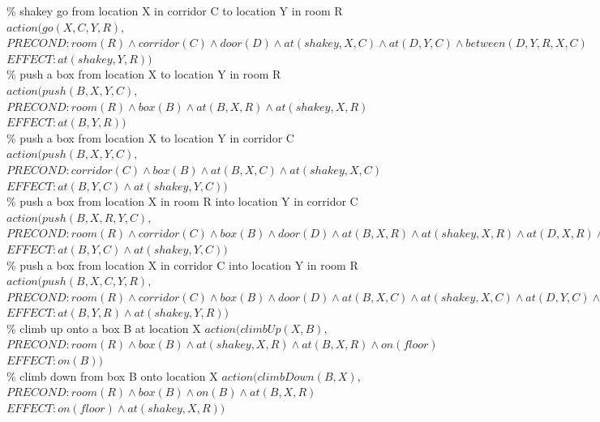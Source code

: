 \documentclass{article}%
\begin{document}
\begin{enumerate}
	\% shakey go from location X in corridor C to location Y in room R
	$action( go(X,C,Y,R), $ \\
	$PRECOND: room(R) \wedge corridor(C) \wedge door(D) \wedge at(shakey,X,C) \wedge at(D,Y,C) \wedge between(D,Y,R,X,C) $ \\
	$EFFECT: at(shakey,Y,R)) $\\
	
	\% push a box from location X to location Y in room R
	$action( push(B,X,Y,C), $ \\
	$PRECOND: room(R) \wedge box(B) \wedge at(B,X,R) \wedge at(shakey,X,R)$\\
	$EFFECT: at(B,Y,R)) $\\
	
    \% push a box from location X to location Y in corridor C
	$action( push(B,X,Y,C), $ \\
	$PRECOND: corridor(C) \wedge box(B) \wedge at(B,X,C) \wedge at(shakey,X,C)$\\
	$EFFECT: at(B,Y,C) \wedge at(shakey,Y,C)) $\\
	
	\% push a box from location X in room R into location Y in corridor C 
	$action( push(B,X,R,Y,C), $ \\
	$PRECOND: room(R) \wedge corridor(C) \wedge box(B) \wedge door(D) \wedge at(B,X,R) \wedge at(shakey,X,R)  \wedge at(D,X,R) \wedge between(D,X,R,Y,C)$ \\
	$EFFECT: at(B,Y,C) \wedge at(shakey,Y,C)) $\\
	
	\% push a box from location X in corridor C into location Y in room R
	$action( push(B,X,C,Y,R), $ \\
	$PRECOND: room(R) \wedge corridor(C) \wedge box(B) \wedge door(D) \wedge at(B,X,C) \wedge at(shakey,X,C) \wedge at(D,Y,C) \wedge between(D,Y,R,X,C)$ \\
	$EFFECT: at(B,Y,R) \wedge at(shakey,Y,R)) $\\
	
	
	\% climb up onto a box B at location X
	$action( climbUp(X,B), $ \\
	$PRECOND: room(R) \wedge box(B) \wedge at(shakey,X,R) \wedge at(B,X,R) \wedge on(floor) $\\
	$EFFECT: on(B)) $\\
	
	\% climb down from box B onto location X
	$action( climbDown(B,X), $ \\
	$PRECOND: room(R) \wedge box(B) \wedge on(B) \wedge at(B, X, R)$\\
	$EFFECT: on(floor) \wedge at(shakey, X, R)) $\\
	

\end{enumerate}
\end{document}
